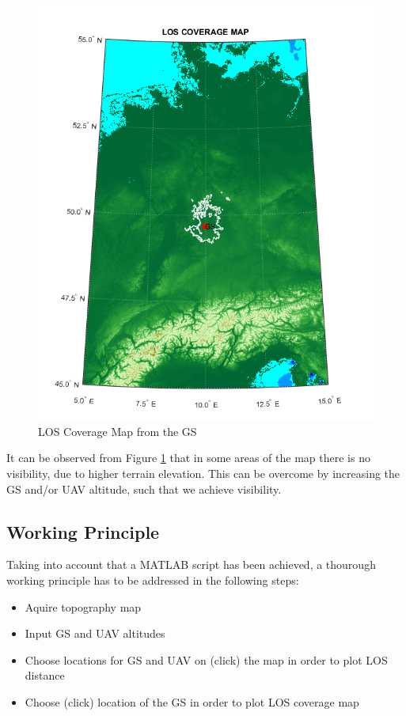 \begin{figure}[h]
	\centering
	\includegraphics[scale=0.5]{figures/gs_coverage_map.png}
	\caption{LOS Coverage Map from the GS}
   	\label{fig:los_area}
\end{figure}

It can be observed from Figure \ref{fig:los_area} that in some areas of the map there is no visibility, due to higher terrain elevation. This can be overcome by increasing the GS and/or UAV altitude, such that we achieve visibility.  

\subsection{Working Principle}
Taking into account that a MATLAB script has been achieved, a thourough working principle has to be addressed in the following steps:
\begin{itemize}
	\item Aquire topography map 
	\item Input GS and UAV altitudes
	\item Choose locations for GS and UAV on (click) the map in order to plot LOS distance
	\item Choose (click) location of the GS in order to plot LOS coverage map
\end{itemize}